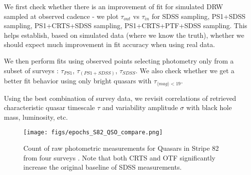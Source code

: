 \documentclass[fleqn,usenatbib]{mnras}  %
\begin{document}
We first check whether there is an improvement of fit for simulated DRW sampled at observed cadence - we plot $\tau_{out}$ vs $\tau_{in}$  for    SDSS sampling,    PS1+SDSS sampling,  PS1+CRTS+SDSS sampling,   PS1+CRTS+PTF+SDSS sampling.  This helps establish, based on simulated data (where we know the truth), whether we should expect much improvement in fit accuracy when using real data. 

We then perform fits using observed points selecting photometry only from a subset of surveys : $\tau_{PS1}$, $\tau_{(PS1+SDSS)}$,  $\tau_{SDSS}$.  We also check whether we get a better fit  behavior using only bright quasars with   $\tau_{\langle mag\rangle<19}$.

Using the best combination of survey data,  we revisit \cite{macleod2011} correlations of retrieved characteristic quasar timescale $\tau$ and variability amplitude $\sigma$ with black hole mass, luminosity, etc.  

\begin{figure}
\texttt{[image: figs/epochs\_S82\_QSO\_compare.png]}
\caption{Count  of raw photometric measurements for Quasars in Stripe 82 from four surveys . Note that both CRTS and OTF significantly increase the original baseline of SDSS measurements.}
\label{fig:baselines}
\end{figure} 









\bsp	%
\label{lastpage}
\end{document}
